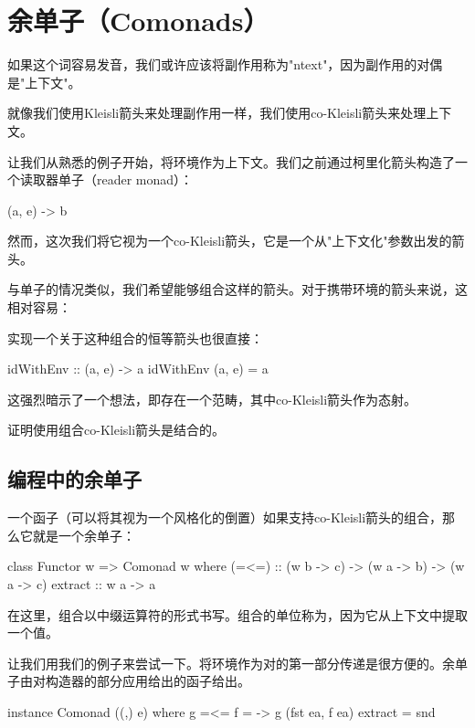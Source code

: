 \documentclass[DaoFP]{subfiles}
\begin{document}
\setcounter{chapter}{16}

\chapter{余单子（Comonads）}

如果这个词容易发音，我们或许应该将副作用称为"ntext"，因为副作用的对偶是"上下文"。

就像我们使用Kleisli箭头来处理副作用一样，我们使用co-Kleisli箭头来处理上下文。

让我们从熟悉的例子开始，将环境作为上下文。我们之前通过柯里化箭头构造了一个读取器单子（reader monad）：
\begin{haskell}
(a, e) -> b
\end{haskell}
然而，这次我们将它视为一个co-Kleisli箭头，它是一个从"上下文化"参数出发的箭头。

与单子的情况类似，我们希望能够组合这样的箭头。对于携带环境的箭头来说，这相对容易：

实现一个关于这种组合的恒等箭头也很直接：

\begin{haskell}
idWithEnv :: (a, e) -> a
idWithEnv (a, e) = a
\end{haskell}

这强烈暗示了一个想法，即存在一个范畴，其中co-Kleisli箭头作为态射。

\begin{exercise}
证明使用组合co-Kleisli箭头是结合的。
\end{exercise}

\section{编程中的余单子}

一个函子（可以将其视为一个风格化的倒置）如果支持co-Kleisli箭头的组合，那么它就是一个余单子：

\begin{haskell}
class Functor w => Comonad w where
   (=<=) :: (w b -> c) -> (w a -> b) -> (w a -> c)
   extract :: w a -> a
\end{haskell}
在这里，组合以中缀运算符的形式书写。组合的单位称为，因为它从上下文中提取一个值。

让我们用我们的例子来尝试一下。将环境作为对的第一部分传递是很方便的。余单子由对构造器的部分应用给出的函子给出。
\begin{haskell}
instance Comonad ((,) e) where
  g =<= f = \ea -> g (fst ea, f ea)
  extract = snd
\end{haskell}
\end{document}
